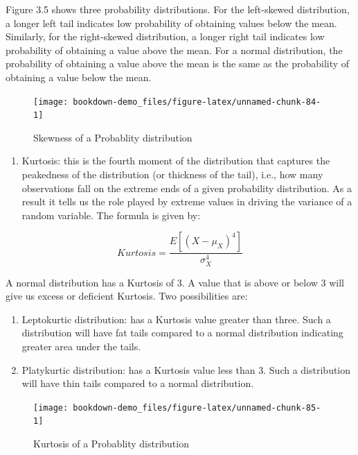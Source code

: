 \documentclass[
]{book}
\providecommand{\tightlist}{%
  \setlength{\itemsep}{0pt}\setlength{\parskip}{0pt}}
\theoremstyle{definition}
\theoremstyle{definition}
\theoremstyle{definition}
\theoremstyle{definition}
\theoremstyle{remark}
\begin{document}
Figure 3.5 shows three probability distributions. For the left-skewed distribution, a longer left tail indicates low probability of obtaining values below the mean. Similarly, for the right-skewed distribution, a longer right tail indicates low probability of obtaining a value above the mean. For a normal distribution, the probability of obtaining a value above the mean is the same as the probability of obtaining a value below the mean.

\begin{figure}

{\centering \texttt{[image: bookdown-demo\_files/figure-latex/unnamed-chunk-84-1]} 

}

\caption{Skewness of a Probablity distribution}\label{fig:unnamed-chunk-84}
\end{figure}

\begin{enumerate}
\def\labelenumi{\arabic{enumi}.}
\setcounter{enumi}{1}
\tightlist
\item
  Kurtosis: this is the fourth moment of the distribution that captures the peakedness of the distribution (or thickness of the tail), i.e., how many observations fall on the extreme ends of a given probability distribution. As a result it tells us the role played by extreme values in driving the variance of a random variable. The formula is given by:
\end{enumerate}

\[Kurtosis=\frac{E[(X-\mu_X)^4]}{\sigma^4_X}\]

A normal distribution has a Kurtosis of 3. A value that is above or below 3 will give us excess or deficient Kurtosis. Two possibilities are:

\begin{enumerate}
\def\labelenumi{\alph{enumi}.}
\item
  Leptokurtic distribution: has a Kurtosis value greater than three. Such a distribution will have fat tails compared to a normal distribution indicating greater area under the tails.
\item
  Platykurtic distribution: has a Kurtosis value less than 3. Such a distribution will have thin tails compared to a normal distribution.
\end{enumerate}

\begin{figure}

{\centering \texttt{[image: bookdown-demo\_files/figure-latex/unnamed-chunk-85-1]} 

}

\caption{Kurtosis of a Probablity distribution}\label{fig:unnamed-chunk-85}
\end{figure}
\end{document}

